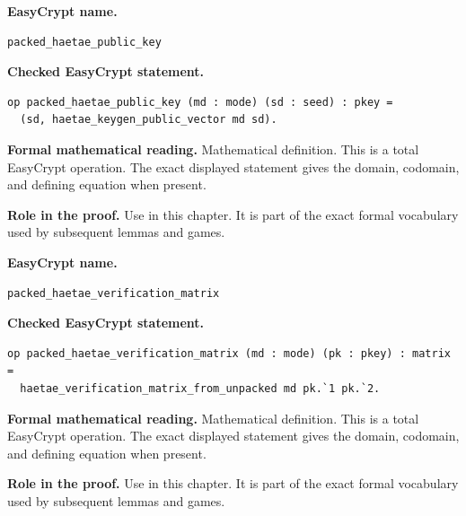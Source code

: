 \begin{formaldefinition}
\noindent\textbf{EasyCrypt name.}
\begin{lstlisting}[language=EasyCrypt,basicstyle=\ttfamily\scriptsize]
packed_haetae_public_key
\end{lstlisting}
\noindent\textbf{Checked EasyCrypt statement.}
\begin{lstlisting}[language=EasyCrypt,basicstyle=\ttfamily\scriptsize]
op packed_haetae_public_key (md : mode) (sd : seed) : pkey =
  (sd, haetae_keygen_public_vector md sd).
\end{lstlisting}
\noindent\textbf{Formal mathematical reading.}
Mathematical definition. This is a total EasyCrypt operation.  The exact displayed statement gives the domain, codomain, and defining equation when present.

\noindent\textbf{Role in the proof.}
Use in this chapter. It is part of the exact formal vocabulary used by subsequent lemmas and games.

\end{formaldefinition}

\begin{formaldefinition}
\noindent\textbf{EasyCrypt name.}
\begin{lstlisting}[language=EasyCrypt,basicstyle=\ttfamily\scriptsize]
packed_haetae_verification_matrix
\end{lstlisting}
\noindent\textbf{Checked EasyCrypt statement.}
\begin{lstlisting}[language=EasyCrypt,basicstyle=\ttfamily\scriptsize]
op packed_haetae_verification_matrix (md : mode) (pk : pkey) : matrix =
  haetae_verification_matrix_from_unpacked md pk.`1 pk.`2.
\end{lstlisting}
\noindent\textbf{Formal mathematical reading.}
Mathematical definition. This is a total EasyCrypt operation.  The exact displayed statement gives the domain, codomain, and defining equation when present.

\noindent\textbf{Role in the proof.}
Use in this chapter. It is part of the exact formal vocabulary used by subsequent lemmas and games.

\end{formaldefinition}

